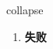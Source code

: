 
\begin{frame}
{\huge collapse}
\begin{center}
\begin{enumerate}\Large
  \item \textbf{失败}
\end{enumerate}
\end{center}
\end{frame}
